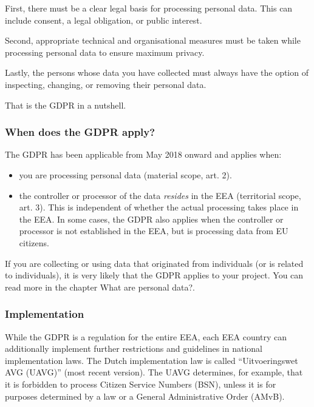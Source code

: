 \documentclass[
]{book}
\providecommand{\tightlist}{%
  \setlength{\itemsep}{0pt}\setlength{\parskip}{0pt}}
\begin{document}
First, there must be a clear legal basis for processing personal data. This can
include consent, a legal obligation, or public interest.

Second, appropriate technical and organisational measures must be taken
while processing personal data to ensure maximum privacy.

Lastly, the persons whose data you have collected must always have the
option of inspecting, changing, or removing their personal data.

That is the GDPR in a nutshell.

\hypertarget{gdpr-scope}{%
\subsubsection{When does the GDPR apply?}\label{gdpr-scope}}

The GDPR has been applicable from May 2018 onward and applies when:

\begin{itemize}
\tightlist
\item
  you are processing personal data
  (material scope, art. 2).
\item
  the controller or processor of the data \emph{resides} in the EEA (territorial
  scope, art. 3).
  This is independent of whether the actual processing takes place in the EEA.
  In some cases, the GDPR also applies when the controller or processor is not
  established in the EEA, but is processing data from EU citizens.
\end{itemize}

If you are collecting or using data that originated from individuals (or is
related to individuals), it is very likely that the GDPR applies to your project.
You can read more in the chapter What are personal data?.

\hypertarget{implementation}{%
\subsubsection{Implementation}\label{implementation}}

While the GDPR is a regulation for the entire EEA, each EEA country can additionally
implement further restrictions and guidelines in national implementation laws. The
Dutch implementation law is called ``Uitvoeringswet AVG (UAVG)''
(most recent version).
The UAVG determines, for example, that it is forbidden to process Citizen
Service Numbers (BSN), unless it is for purposes determined by a law or a
General Administrative Order (AMvB).
\end{document}
